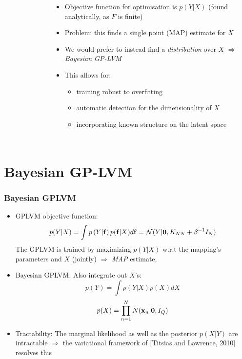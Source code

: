 \documentclass{beamer}
\begin{document}
\begin{frame}
\begin{columns}
{\begin{figure}
\begin{center}
	\end{center}
	\end{figure}
	}
 \hspace{-20pt}
 \begin{itemize}
                 \item<1-> Objective function for optimisation is $p(Y|X)$ \small{(found analytically, as $F$ is finite)}
	\vspace{5pt} \item<2-> Problem: this finds a single point (\alert{MAP}) estimate for $X$
	\vspace{5pt} \item<3-> We would prefer to instead find a \emph{distribution} over $X$ $\Rightarrow$ \emph{\alert{Bayesian} GP-LVM}
	\vspace{5pt} \item<4-> This allows for:
	\begin{itemize} 
	   \item training robust to overfitting 
	   \item automatic detection for the dimensionality of $X$
	   \item incorporating known structure on the latent space
	\end{itemize}
 \end{itemize}
\end{columns}
\end{frame}



\section{Bayesian GP-LVM}
\begin{frame}
 \frametitle{Bayesian GPLVM}
\begin{itemize}	
\item
	GPLVM \alert{objective function}: 
	$$
	p(Y|X) = \int p \left( Y | {\bf f} \right)	p({\bf f} | X) d {\bf f} = \mathcal{N}(Y | \mathbf{0}, K_{NN}+\beta^{-1} I_N)
	$$
	The GPLVM is trained by maximizing $p(Y|X)$ w.r.t the mapping's parameters and $X$ (jointly) $\Rightarrow$ \textit{MAP} estimate,
\vspace{8pt}
\item \alert{Bayesian GPLVM}:
	Also integrate out $X$'s:
	$$
	p(Y) = \int p \left( Y | X \right) p(X) dX 
	$$ $$
	p(X) = \prod_{n=1}^{N} N({\bf x}_n | \mathbf{0}, I_Q)
	$$
\vspace{8pt}
\pause
\item \alert{Tractability}:
	The marginal likelihood as well as the posterior $p(X | Y)$ are intractable
	    $\Rightarrow$ the variational framework of \small{[Titsias and Lawrence, 2010]} resolves this
\end{itemize}
\end{frame}
\end{document}

